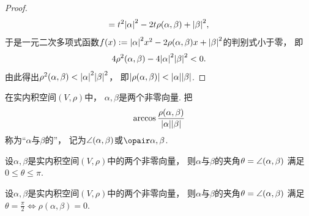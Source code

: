 \begin{theorem}
\begin{proof}
\begin{equation*}
	= t^2 \abs{\alpha}^2
	- 2t \rho(\alpha,\beta)
	+ \abs{\beta}^2,
\end{equation*}
于是一元二次多项式函数\(
	f(x)
	:=
	\abs{\alpha}^2 x^2
	- 2 \rho(\alpha,\beta) x
	+ \abs{\beta}^2
\)的判别式小于零，
即\begin{equation*}
	4 \rho^2(\alpha,\beta)
	- 4 \abs{\alpha}^2 \abs{\beta}^2
	< 0.
\end{equation*}
由此得出\(
	\rho^2(\alpha,\beta)
	< \abs{\alpha}^2 \abs{\beta}^2
\)，
即\(
	\abs{\rho(\alpha,\beta)}
	< \abs{\alpha} \abs{\beta}
\).
\end{proof}
\end{theorem}

\begin{definition}
在实内积空间\((V,\rho)\)中，
\(\alpha,\beta\)是两个非零向量.
把\begin{equation}
	\arccos\frac{\rho(\alpha,\beta)}{\abs{\alpha} \abs{\beta}}
\end{equation}
称为“\(\alpha\)与\(\beta\)的”，
记为\(\angle(\alpha,\beta)\)或\(\VectorAngleP{\alpha}{\beta}\).
\end{definition}

\begin{property}
设\(\alpha,\beta\)是实内积空间\((V,\rho)\)中的两个非零向量，
则\(\alpha\)与\(\beta\)的夹角\(\theta = \angle(\alpha,\beta)\)
满足\(0 \leq \theta \leq \pi\).
\end{property}

\begin{property}
设\(\alpha,\beta\)是实内积空间\((V,\rho)\)中的两个非零向量，
则\(\alpha\)与\(\beta\)的夹角\(\theta = \angle(\alpha,\beta)\)
满足\(\theta = \frac\pi2 \iff \rho(\alpha,\beta) = 0\).
\end{property}

